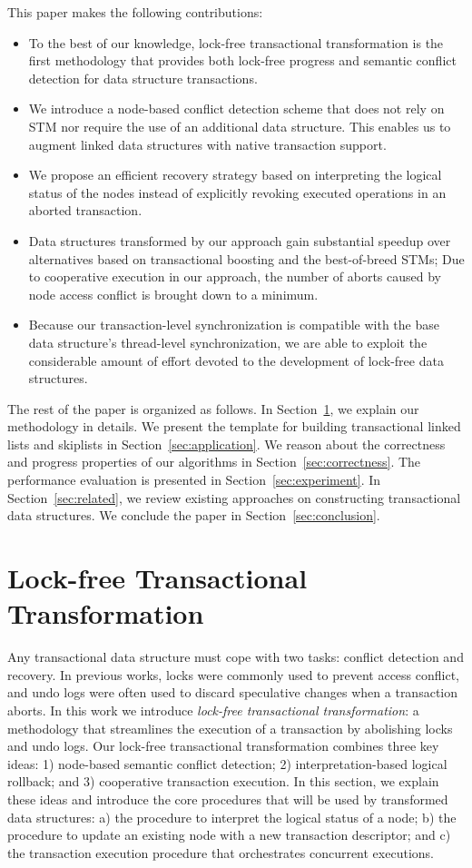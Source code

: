 \documentclass[]{sig-alternate-05-2015}
\begin{document}
This paper makes the following contributions:
\begin{itemize}
    \item To the best of our knowledge, lock-free transactional transformation is the first methodology that provides both lock-free progress and semantic conflict detection for data structure transactions. 
    \item We introduce a node-based conflict detection scheme that does not rely on STM nor require the use of an additional data structure. This enables us to augment linked data structures with native transaction support.
    \item We propose an efficient recovery strategy based on interpreting the logical status of the nodes instead of explicitly revoking executed operations in an aborted transaction.
    \item Data structures transformed by our approach gain substantial speedup over alternatives based on transactional boosting and the best-of-breed STMs; Due to cooperative execution in our approach, the number of aborts caused by node access conflict is brought down to a minimum.
    \item Because our transaction-level synchronization is compatible with the base data structure's thread-level synchronization, we are able to exploit the considerable amount of effort devoted to the development of lock-free data structures.
\end{itemize}

The rest of the paper is organized as follows. 
In Section~\ref{sec:algorithm}, we explain our methodology in details.
We present the template for building transactional linked lists and skiplists in Section~\ref{sec:application}.
We reason about the correctness and progress properties of our algorithms in Section~\ref{sec:correctness}.
The performance evaluation is presented in Section~\ref{sec:experiment}.
In Section~\ref{sec:related}, we review existing approaches on constructing transactional data structures.
We conclude the paper in Section~\ref{sec:conclusion}.

\section{Lock-free Transactional Transformation}
\label{sec:algorithm}
Any transactional data structure must cope with two tasks: conflict detection and recovery.
In previous works, locks were commonly used to prevent access conflict, and undo logs were often used to discard speculative changes when a transaction aborts.
In this work we introduce \emph{lock-free transactional transformation}: a methodology that streamlines the execution of a transaction by abolishing locks and undo logs.
Our lock-free transactional transformation combines three key ideas: 1) node-based semantic conflict detection; 2) interpretation-based logical rollback; and 3) cooperative transaction execution.
In this section, we explain these ideas and introduce the core procedures that will be used by transformed data structures: a) the procedure to interpret the logical status of a node; b) the procedure to update an existing node with a new transaction descriptor; and c) the transaction execution procedure that orchestrates concurrent executions.
\end{document}
